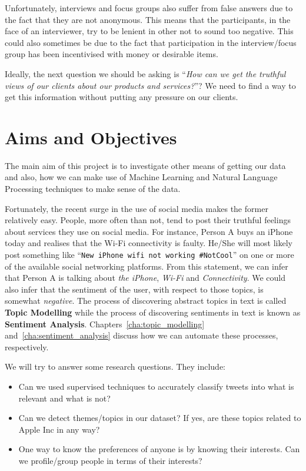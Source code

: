 Unfortunately, interviews and focus groups also suffer from false answers due to the fact that they
are not anonymous. This means that the participants, in the face of an interviewer, try to be
lenient in other not to sound too negative. This could also sometimes be due to the fact that
participation in the interview/focus group has been incentivised with money or desirable items.

Ideally, the next question we should be asking is ``\textit{How can we get the truthful views of our
clients about our products and services?}''? We need to find a way to get this information without
putting any pressure on our clients.

\section{Aims and Objectives}
\label{sec:objectives}
The main aim of this project is to investigate other means of getting our data and also, how we can
make use of Machine Learning and Natural Language Processing techniques to make sense of the data.

Fortunately, the recent surge in the use of social media makes the former relatively easy. People,
more often than not, tend to post their truthful feelings about services they use on social media.
For instance, Person A buys an iPhone today and realises that the Wi-Fi connectivity is faulty.
He/She will most likely post something like ``\texttt{New iPhone wifi not working \#NotCool}'' on
one or more of the available social networking platforms. From this statement, we can infer that
Person A is talking about \textit{the iPhone}, \textit{Wi-Fi} and \textit{Connectivity}. We could
also infer that the sentiment of the user, with respect to those topics, is somewhat
\textit{negative}. The process of discovering abstract topics in text is called \textbf{Topic
Modelling} while the process of discovering sentiments in text is known as \textbf{Sentiment
Analysis}. Chapters~\ref{cha:topic_modelling} and~\ref{cha:sentiment_analysis} discuss how we can
automate these processes, respectively.

We will try to answer some research questions. They include:
\begin{itemize}
  \item Can we used supervised techniques to accurately classify tweets into what is relevant and
    what is not?
  \item Can we detect themes/topics in our dataset? If yes, are these topics related to Apple Inc in
    any way?
  \item One way to know the preferences of anyone is by knowing their interests. Can we
    profile/group people in terms of their interests?
\end{itemize}

